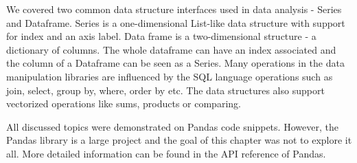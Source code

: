 We covered two common data structure interfaces used in data analysis - Series and Dataframe.
Series is a one-dimensional List-like data structure with support for index and an axis label.
Data frame is a two-dimensional structure - a dictionary of columns.
The whole dataframe can have an index associated and the column of a Dataframe can be seen as a Series.
Many operations in the data manipulation libraries are influenced by the SQL language operations such as join, select,
group by, where, order by etc.
The data structures also support vectorized operations like sums, products or comparing.

All discussed topics were demonstrated on Pandas code snippets.
However, the Pandas library is a large project and the goal of this chapter was not to explore it all.
More detailed information can be found in the API reference of Pandas\cite{pandas_docs}.
